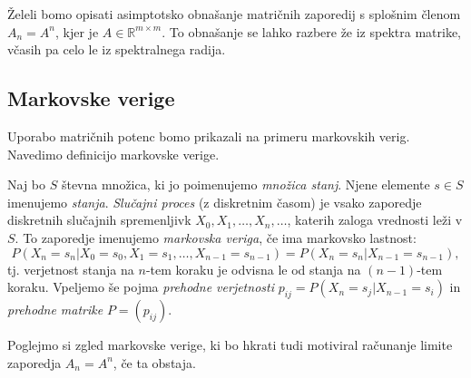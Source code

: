 \documentclass[mat1]{fmfdelo}
\newcommand{\R}{\mathbb R}
\begin{document}
Želeli bomo opisati asimptotsko obnašanje matričnih zaporedij s splošnim členom $A_n = A^n$, kjer je $A \in \R^{m \times m}$. To obnašanje se lahko razbere že iz spektra matrike, včasih pa celo le iz spektralnega radija.

\subsection{Markovske verige}

Uporabo matričnih potenc bomo prikazali na primeru markovskih verig. Navedimo definicijo markovske verige.
\begin{definicija}
    Naj bo $S$ števna množica, ki jo poimenujemo \emph{množica stanj}. Njene elemente $s \in S$ imenujemo \emph{stanja}. \emph{Slučajni proces} (z diskretnim časom) je vsako zaporedje diskretnih slučajnih spremenljivk $X_0, X_1, \ldots, X_n, \ldots$, katerih zaloga vrednosti leži v $S$. To zaporedje imenujemo \emph{markovska veriga}, če ima markovsko lastnost:
    \begin{equation}
        P(X_n = s_n | X_0 = s_0, X_1 = s_1, \ldots, X_{n-1} = s_{n-1}) = P(X_n = s_n | X_{n-1} = s_{n-1}),
    \end{equation}
    tj. verjetnost stanja na $n$-tem koraku je odvisna le od stanja na $(n-1)$-tem koraku. Vpeljemo še pojma \emph{prehodne verjetnosti} $p_{ij} = P(X_n = s_j | X_{n-1} = s_i)$ in \emph{prehodne matrike} $P = (p_{ij})$.
\end{definicija}
Poglejmo si zgled markovske verige, ki bo hkrati tudi motiviral računanje limite zaporedja $A_n = A^n$, če ta obstaja. 
\end{document}
